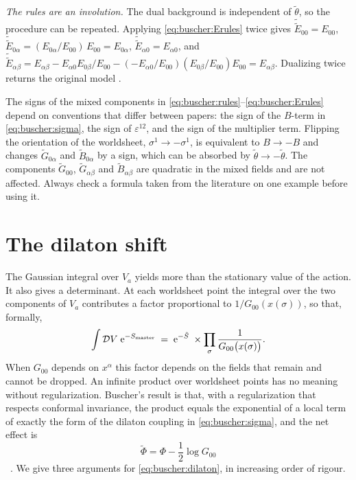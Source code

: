 \emph{The rules are an involution.} The dual background is independent of $\tilde\theta$, so
the procedure can be repeated. Applying \eqref{eq:buscher:Erules} twice gives
$\tilde{\tilde E}_{00}=E_{00}$,
$\tilde{\tilde E}_{0\alpha}=(E_{0\alpha}/E_{00})\,E_{00}=E_{0\alpha}$,
$\tilde{\tilde E}_{\alpha0}=E_{\alpha0}$, and
$\tilde{\tilde E}_{\alpha\beta}=E_{\alpha\beta}-E_{\alpha0}E_{0\beta}/E_{00}
-(-E_{\alpha0}/E_{00})(E_{0\beta}/E_{00})E_{00}=E_{\alpha\beta}$. Dualizing twice returns the
original model .

\begin{pitfallbox}
The signs of the mixed components in \eqref{eq:buscher:rules}--\eqref{eq:buscher:Erules}
depend on conventions that differ between papers: the sign of the $B$-term in
\eqref{eq:buscher:sigma}, the sign of $\varepsilon^{12}$, and the sign of the multiplier
term. Flipping the orientation of the worldsheet, $\sigma^1\to-\sigma^1$, is equivalent to
$B\to-B$  and changes $\tilde G_{0\alpha}$ and
$\tilde B_{0\alpha}$ by a sign, which can be absorbed by $\tilde\theta\to-\tilde\theta$. The
components $\tilde G_{00}$, $\tilde G_{\alpha\beta}$ and $\tilde B_{\alpha\beta}$ are quadratic
in the mixed fields and are not affected. Always check a formula taken from the literature on
one example before using it.
\end{pitfallbox}

\section{The dilaton shift}\label{sec:buscher:dilaton}

The Gaussian integral over $V_a$ yields more than the stationary value of the action. It also
gives a determinant. At each worldsheet point the integral over the two components of $V_a$
contributes a factor proportional to $1/G_{00}(x(\sigma))$, so that, formally,
\begin{equation}\label{eq:buscher:formaldet}
 \int\mathcal DV\;\mathrm{e}^{-S_{\rm master}}\;=\;\mathrm{e}^{-\tilde S}\;\times
 \prod_{\sigma}\frac{1}{G_{00}\big(x(\sigma)\big)} .
\end{equation}
When $G_{00}$ depends on $x^\alpha$ this factor depends on the fields that remain and cannot be
dropped. An infinite product over worldsheet points has no meaning without regularization.
Buscher's result is that, with a regularization that respects conformal invariance, the
product equals the exponential of a local term of exactly the form of the dilaton coupling in
\eqref{eq:buscher:sigma}, and the net effect is
\begin{equation}\label{eq:buscher:dilaton}
 \tilde\Phi=\Phi-\frac12\log G_{00}
\end{equation}
\TL\ . We give three arguments for
\eqref{eq:buscher:dilaton}, in increasing order of rigour.

